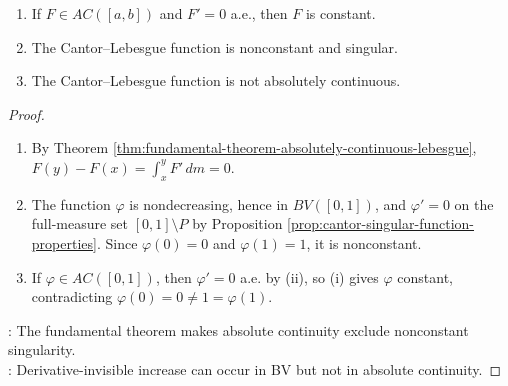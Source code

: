 \begin{corollary} \label{cor:absolutely-continuous-singular-functions-constant} 
\begin{enumerate}[label=(\roman*)]
\setlength{\itemsep}{0pt}
\item If $F\in AC([a,b])$ and $F'=0$ a.e., then $F$ is constant.
\item The Cantor--Lebesgue function is nonconstant and singular.
\item The Cantor--Lebesgue function is not absolutely continuous.
\end{enumerate}
\begin{proof}
\begin{enumerate}[label=(\roman*)]
\setlength{\itemsep}{0pt}
\item By Theorem \ref{thm:fundamental-theorem-absolutely-continuous-lebesgue}, $F(y)-F(x)=\int_x^yF'\,dm=0$.
\item The function $\varphi$ is nondecreasing, hence in $BV([0,1])$, and $\varphi'=0$ on the full-measure set $[0,1]\setminus P$ by Proposition \ref{prop:cantor-singular-function-properties}. Since $\varphi(0)=0$ and $\varphi(1)=1$, it is nonconstant.
\item If $\varphi\in AC([0,1])$, then $\varphi'=0$ a.e. by (ii), so (i) gives $\varphi$ constant, contradicting $\varphi(0)=0\neq1=\varphi(1)$.
\end{enumerate}
: The fundamental theorem makes absolute continuity exclude nonconstant singularity.\\
: Derivative-invisible increase can occur in BV but not in absolute continuity.
\end{proof}
\end{corollary}
